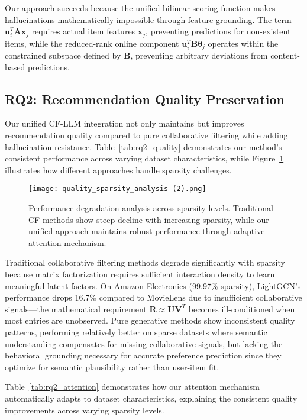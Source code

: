 \documentclass[acmsmall]{acmart}
\begin{document}
Our approach succeeds because the unified bilinear scoring function makes hallucinations mathematically impossible through feature grounding. The term $\mathbf{u}_i^T \mathbf{A} \mathbf{x}_j$ requires actual item features $\mathbf{x}_j$, preventing predictions for non-existent items, while the reduced-rank online component $\mathbf{u}_i^T \mathbf{B} \boldsymbol{\theta}_j$ operates within the constrained subspace defined by $\mathbf{B}$, preventing arbitrary deviations from content-based predictions.

\subsection{RQ2: Recommendation Quality Preservation}

Our unified CF-LLM integration not only maintains but improves recommendation quality compared to pure collaborative filtering while adding hallucination resistance. Table~\ref{tab:rq2_quality} demonstrates our method's consistent performance across varying dataset characteristics, while Figure~\ref{fig:rq2_sparsity} illustrates how different approaches handle sparsity challenges.
\begin{figure}[h]
\centering
\texttt{[image: quality\_sparsity\_analysis (2).png]}
\caption{Performance degradation analysis across sparsity levels. Traditional CF methods show steep decline with increasing sparsity, while our unified approach maintains robust performance through adaptive attention mechanism.}
\label{fig:rq2_sparsity}
\end{figure}
Traditional collaborative filtering methods degrade significantly with sparsity because matrix factorization requires sufficient interaction density to learn meaningful latent factors. On Amazon Electronics (99.97\% sparsity), LightGCN's performance drops 16.7\% compared to MovieLens due to insufficient collaborative signals—the mathematical requirement $\mathbf{R} \approx \mathbf{U}\mathbf{V}^T$ becomes ill-conditioned when most entries are unobserved. Pure generative methods show inconsistent quality patterns, performing relatively better on sparse datasets where semantic understanding compensates for missing collaborative signals, but lacking the behavioral grounding necessary for accurate preference prediction since they optimize for semantic plausibility rather than user-item fit.

Table~\ref{tab:rq2_attention} demonstrates how our attention mechanism automatically adapts to dataset characteristics, explaining the consistent quality improvements across varying sparsity levels.
\end{document}
